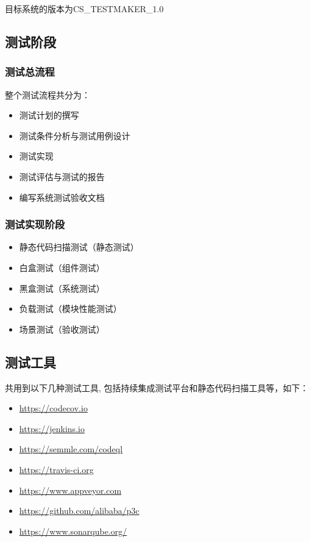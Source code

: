 \documentclass[hyperref, a4paper]{ctexart}
\providecommand{\tightlist}{%
  \setlength{\itemsep}{0pt}\setlength{\parskip}{0pt}}
\begin{document}
目标系统的版本为CS\_TESTMAKER\_1.0

\hypertarget{ux6d4bux8bd5ux9636ux6bb5}{%
\subsection{测试阶段}\label{ux6d4bux8bd5ux9636ux6bb5}}

\hypertarget{ux6d4bux8bd5ux603bux6d41ux7a0b}{%
\subsubsection{测试总流程}\label{ux6d4bux8bd5ux603bux6d41ux7a0b}}

整个测试流程共分为：

\begin{itemize}
\item
  测试计划的撰写
\item
  测试条件分析与测试用例设计
\item
  测试实现
\item
  测试评估与测试的报告
\item
  编写系统测试验收文档
\end{itemize}

\hypertarget{ux6d4bux8bd5ux5b9eux73b0ux9636ux6bb5}{%
\subsubsection{测试实现阶段}\label{ux6d4bux8bd5ux5b9eux73b0ux9636ux6bb5}}

\begin{itemize}
\tightlist
\item
  静态代码扫描测试（静态测试）
\item
  白盒测试（组件测试）
\item
  黑盒测试（系统测试）
\item
  负载测试（模块性能测试）
\item
  场景测试（验收测试）
\end{itemize}

\hypertarget{ux6d4bux8bd5ux5de5ux5177}{%
\subsection{测试工具}\label{ux6d4bux8bd5ux5de5ux5177}}

共用到以下几种测试工具, 包括持续集成测试平台和静态代码扫描工具等，如下：

\begin{itemize}
\item
  \url{https://codecov.io}
\item
  \url{https://jenkins.io}
\item
  \url{https://semmle.com/codeql}
\item
  \url{https://travis-ci.org}
\item
  \url{https://www.appveyor.com}
\item
  \url{https://github.com/alibaba/p3c}
\item
  \url{https://www.sonarqube.org/}
\end{itemize}
\end{document}
